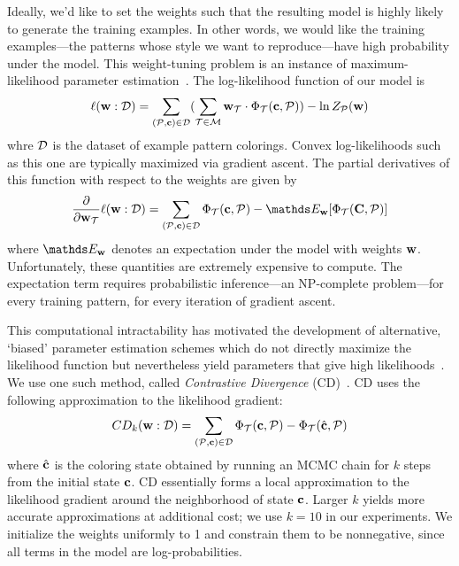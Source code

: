Ideally, we'd like to set the weights such that the resulting model is highly likely to generate the training examples. In other words, we would like the training examples---the patterns whose style we want to reproduce---have high probability under the model. This weight-tuning problem is an instance of maximum-likelihood parameter estimation~\cite{PGMBook}. The log-likelihood function of our model is
\begin{equation*}
\ell(\mathbf{w} : \mathcal{D}) =
	\sum_{(\mathcal{P}, \mathbf{c}) \in \mathcal{D}}
	(
		\sum_{\mathcal{T} \in \mathcal{M}}
			\mathbf{w}_{\mathcal{T}} \cdot \Phi_{\mathcal{T}}(\mathbf{c}, \mathcal{P})
	)			
		- \ln{Z_{\mathcal{P}}(\mathbf{w})}
\end{equation*}
whre $\mathcal{D}$ is the dataset of example pattern colorings. Convex log-likelihoods such as this one are typically maximized via gradient ascent. The partial derivatives of this function with respect to the weights are given by
\begin{equation*}
\frac{\partial}{\partial \weights_\term} \ell(\weights : \dataset) = 
	\sum_{(\pattern, \colors) \in \dataset}
			\termStats(\colors, \pattern)
		- \expectation_\weights[\termStats(\colorVars, \pattern)]
\end{equation*}
where $\expectation_\weights$ denotes an expectation under the model with weights $\mathbf{w}$. Unfortunately, these quantities are extremely expensive to compute. The expectation term requires probabilistic inference---an NP-complete problem---for every training pattern, for every iteration of gradient ascent.

This computational intractability has motivated the development of alternative, `biased' parameter estimation schemes which do not directly maximize the likelihood function but nevertheless yield parameters that give high likelihoods~\cite{NonMLEParameterEstimation}. We use one such method, called \emph{Contrastive Divergence} (CD)~\cite{ContrastiveDivergence}. CD uses the following approximation to the likelihood gradient:
\begin{equation*}
CD_k(\mathbf{w} : \mathcal{D}) = 
	\sum_{(\mathcal{P}, \mathbf{c}) \in \mathcal{D}}
			\Phi_{\mathcal{T}}(\mathbf{c}, \mathcal{P})
		 -\Phi_{\mathcal{T}}(\hat{\mathbf{c}}, \mathcal{P})
\end{equation*}
where $\hat{\mathbf{c}}$ is the coloring state obtained by running an MCMC chain for $k$ steps from the initial state $\mathbf{c}$. CD essentially forms a local approximation to the likelihood gradient around the neighborhood of state $\mathbf{c}$. Larger $k$ yields more accurate approximations at additional cost; we use $k = 10$ in our experiments. We initialize the weights uniformly to 1 and constrain them to be nonnegative, since all terms in the model are log-probabilities.

